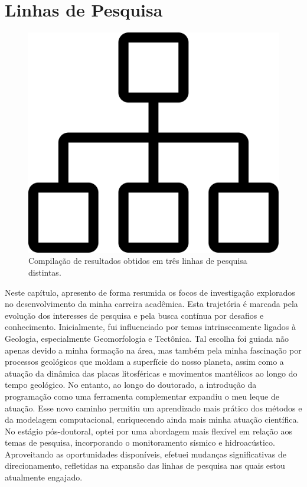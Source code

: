 \documentclass[10pt,a4paper,oneside]{book}
\newcommand{\HeroFigPad}{\vspace{-1cm}}
\begin{document}

\chapter{Linhas de Pesquisa}
\label{cap_pesquisa}

\begin{figure}[h]
  \HeroFigPad
  \begin{center}
    \includegraphics[width=\textwidth]{images/inicio.png}
  \end{center}
  \caption{
    Compilação de resultados obtidos em três linhas de pesquisa distintas.
  }
\end{figure}

Neste capítulo, apresento de forma resumida os focos de investigação explorados no desenvolvimento da minha carreira acadêmica. Esta trajetória é marcada pela evolução dos interesses de pesquisa e pela busca contínua por desafios e conhecimento. Inicialmente, fui influenciado por temas intrinsecamente ligados à Geologia, especialmente Geomorfologia e Tectônica. Tal escolha foi guiada não apenas devido a minha formação na área, mas também pela minha fascinação por processos geológicos que moldam a superfície do nosso planeta, assim como a atuação da dinâmica das placas litosféricas e movimentos mantélicos ao longo do tempo geológico. No entanto, ao longo do doutorado, a introdução da programação como uma ferramenta complementar expandiu o meu leque de atuação. Esse novo caminho permitiu um aprendizado mais prático dos métodos e da modelagem computacional, enriquecendo ainda mais minha atuação científica. No estágio pós-doutoral, optei por uma abordagem mais flexível em relação aos temas de pesquisa, incorporando o monitoramento sísmico e hidroacústico. Aproveitando as oportunidades disponíveis, efetuei mudanças significativas de direcionamento, refletidas na expansão das linhas de pesquisa nas quais estou atualmente engajado. 
\end{document}

